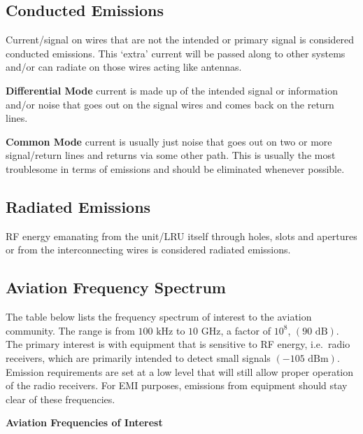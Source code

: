\documentclass[
]{book}
\begin{document}
\hypertarget{conducted-emissions}{%
\subsection{Conducted Emissions}\label{conducted-emissions}}

Current/signal on wires that are not the intended or primary signal is
considered conducted emissions. This `extra' current will be passed along to
other systems and/or can radiate on those wires acting like antennas.

\textbf{Differential Mode} current is made up of the intended signal or information
and/or noise that goes out on the signal wires and comes back on the return
lines.

\textbf{Common Mode} current is usually just noise that goes out on two or more
signal/return lines and returns via some other path. This is usually the most
troublesome in terms of emissions and should be eliminated whenever possible.

\hypertarget{radiated-emissions}{%
\subsection{Radiated Emissions}\label{radiated-emissions}}

RF energy emanating from the unit/LRU itself through holes, slots and apertures
or from the interconnecting wires is considered radiated emissions.

\hypertarget{aviation-frequency-spectrum}{%
\subsection{Aviation Frequency Spectrum}\label{aviation-frequency-spectrum}}

The table below lists the frequency spectrum of interest to the aviation
community. The range is from \(100 \text{ kHz}\) to \(10 \text{ GHz}\), a
factor of \(10^8\), \(\left(90 \text{ dB}\right)\). The primary interest is
with equipment that is sensitive to RF energy, i.e.~radio receivers, which are
primarily intended to detect small signals \(\left(-105 \text{ dBm}\right)\).
Emission requirements are set at a low level that will still allow proper
operation of the radio receivers. For EMI purposes, emissions from equipment
should stay clear of these frequencies.

\textbf{Aviation Frequencies of Interest}
\end{document}
